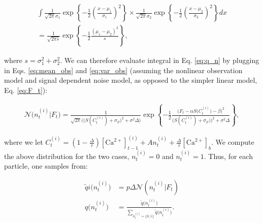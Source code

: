 \documentclass[12pt]{article}
\newcommand{\Ca}{[\text{Ca}^{2+}]}
\begin{document}
\begin{multline} \label{eq:gauss_rule}
\int \frac{1}{\sqrt{2 \pi} \sigma_1} \exp\left\{-\frac{1}{2} \left(\frac{x-\mu_1}{\sigma_1}\right)^2\right\} \times \frac{1}{\sqrt{2 \pi} \sigma_2} \exp\left\{-\frac{1}{2} \left(\frac{x-\mu_2}{\sigma_2}\right)^2\right\} dx
\\ =\frac{1}{\sqrt{2 \pi s}} \exp\left\{-\frac{1}{2}\frac{(\mu_1 - \mu_2)^2}{s}\right\},
\end{multline}

\noindent where $s=\sigma_1^2 + \sigma_2^2$. We can therefore evaluate integral in Eq. \ref{eq:q_n} by plugging in Eqs. \ref{eq:mean_obs} and \ref{eq:var_obs} (assuming the nonlinear observation model and signal dependent noise model, as opposed to the simpler linear model, Eq. \ref{eq:F_t}): 


\begin{multline} \label{eq:q_nn}
\mathcal{N}\big(n_t^{(i)} | F_t\big) = \frac{1}{\sqrt{2 \pi} \big(\big(S(
C_t^{(i)}) + \sigma_F\big)^2 + \sigma^2 \Delta\big)}  \exp \left\{-\frac{1}{2}\frac{\big(F_t - \alpha S\big(C_t^{(i)}\big) - \beta \big)^2}{\big(S(C_t^{(i)}) + \sigma_F)\big)^2 + \sigma^2 \Delta}\right\},
\end{multline}

\noindent where we let $C_t^{(i)}=(1-\frac{\Delta}{\tau}) \Ca_{t-1}^{(i)} + A n_t^{(i)} + \frac{\Delta}{\tau} \Ca_b$.  We compute the above distribution for the two cases, $n_t^{(i)}=0$ and $n_t^{(i)}=1$.  Thus, for each particle, one samples from:

\begin{subequations} \label{aeq:qn1}
\begin{align}
\widetilde{q}i\big(n_t^{(i)}\big)&=p \Delta \mathcal{N}(n_t^{(i)} | F_t)\\
q\big(n_t^{(i)}\big)&=\frac{\widetilde{q}\big(n_t^{(i)}\big)}{\sum_{n_t^{(i)}=\{0,1\}} \widetilde{q}\big(n_t^{(i)}\big)}.
\end{align}
\end{subequations}
\end{document}
